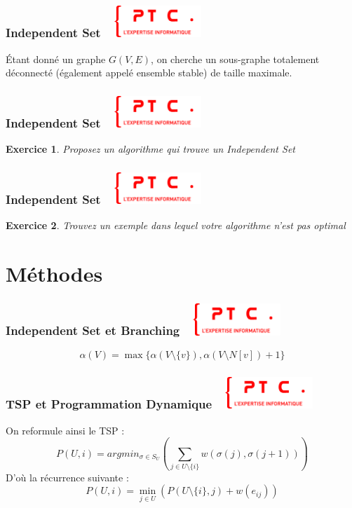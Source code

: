 \documentclass[11pt]{beamer}
\newenvironment{slide}[1]{%
\begin{frame}[environment=slide]
\frametitle{#1~\hfill~\includegraphics[height=1.2cm]{./epitech.png}}
}{%
\end{frame}
}
\newtheorem{exercice}{Exercice}
\begin{document}
\begin{slide}{Independent Set}
\'Etant donné un graphe $G(V,E)$, on cherche un sous-graphe totalement déconnecté (également appelé ensemble stable) de taille maximale.
\end{slide}

\begin{slide}{Independent Set}
\begin{exercice}
Proposez un algorithme qui trouve un Independent Set
\end{exercice}
\end{slide}

\begin{slide}{Independent Set}
\begin{exercice}
Trouvez un exemple dans lequel votre algorithme n'est pas optimal
\end{exercice}
\end{slide}

\section{Méthodes}


\begin{slide}{Independent Set et Branching}
\begin{equation*}
\alpha(V) = \max \{\alpha(V\setminus\{v\}),\alpha(V\setminus N[v])+1\}
\end{equation*}
\end{slide}

\begin{slide}{TSP et Programmation Dynamique}
On reformule ainsi le TSP :
$$P(U,i)=argmin_{\sigma \in S_U} \left(\sum_{j \in U\setminus\{i\}}w(\sigma(j),\sigma(j+1))\right)$$
D'où la récurrence suivante :
\begin{equation*}
P(U,i) = \min_{j \in U} \left( P(U\setminus\{i\},j)+w(e_{ij}) \right)
\end{equation*}
\end{slide}
\end{document}
